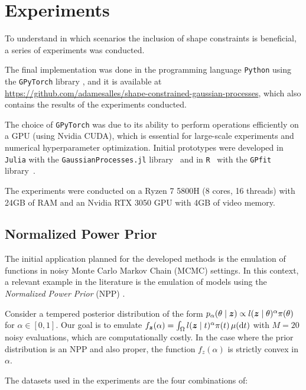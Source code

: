 \section{Experiments}

To understand in which scenarios the inclusion of shape constraints is beneficial, a series of experiments was conducted.

The final implementation was done in the programming language \texttt{Python} using the \texttt{GPyTorch} library \cite{Gardner2021}, and it is available at \url{https://github.com/adamesalles/shape-constrained-gaussian-processes}, which also contains the results of the experiments conducted.

The choice of \texttt{GPyTorch} was due to its ability to perform operations efficiently on a GPU (using Nvidia CUDA), which is essential for large-scale experiments and numerical hyperparameter optimization. Initial prototypes were developed in \texttt{Julia} with the \texttt{GaussianProcesses.jl} library~\cite{Fairbrother2022} and in \texttt{R}~\cite{R} with the \texttt{GPfit} library~\cite{GPfit2015}.

The experiments were conducted on a Ryzen 7 5800H (8 cores, 16 threads) with 24GB of RAM and an Nvidia RTX 3050 GPU with 4GB of video memory.

\subsection{Normalized Power Prior}

The initial application planned for the developed methods is the emulation of functions in noisy Monte Carlo Markov Chain (MCMC) settings.
In this context, a relevant example in the literature is the emulation of models using the \textit{Normalized Power Prior} (NPP) \cite{Carvalho2021}.


Consider a tempered posterior distribution of the form \( p_{\alpha}(\theta \mid \boldsymbol{z}) \propto l(\boldsymbol{z} \mid \theta)^\alpha\pi(\theta) \) for \( \alpha \in [0, 1] \).
Our goal is to emulate \( f_{\boldsymbol{z}}(\alpha) = \int_{\Omega}l(\boldsymbol{z} \mid t)^\alpha\pi(t)\, \mu(\mathrm{d}t) \) with \( M = 20 \) noisy evaluations, which are computationally costly.
In the case where the prior distribution is an NPP and also proper, the function \( f_{z}(\alpha) \) is strictly convex in \( \alpha \).

The datasets used in the experiments are the four combinations of:

